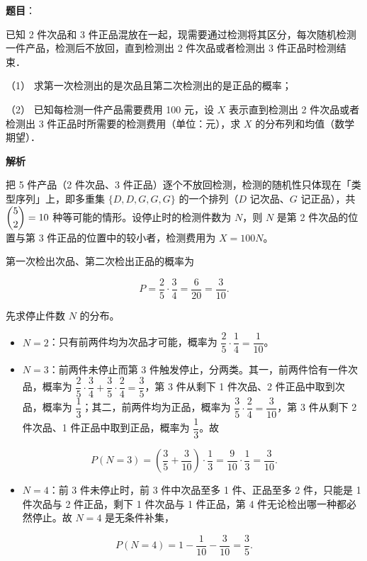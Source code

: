 \begin{answer}

\textbf{题目}：

已知 2 件次品和 3 件正品混放在一起，现需要通过检测将其区分，每次随机检测一件产品，检测后不放回，直到检测出 2 件次品或者检测出 3 件正品时检测结束．

（1） 求第一次检测出的是次品且第二次检测出的是正品的概率；

（2） 已知每检测一件产品需要费用 100 元，设 \(X\) 表示直到检测出 2 件次品或者检测出 3 件正品时所需要的检测费用（单位：元），求 \(X\) 的分布列和均值（数学期望）．

\textbf{解析}

把 5 件产品（2 件次品、3 件正品）逐个不放回检测，检测的随机性只体现在「类型序列」上，即多重集 \(\{D,D,G,G,G\}\) 的一个排列（\(D\) 记次品、\(G\) 记正品），共 \(\dbinom{5}{2}=10\) 种等可能的情形。设停止时的检测件数为 \(N\)，则 \(N\) 是第 2 件次品的位置与第 3 件正品的位置中的较小者，检测费用为 \(X=100N\)。


第一次检出次品、第二次检出正品的概率为

\nopagebreak[4]
\[
P=\dfrac{2}{5}\cdot\dfrac{3}{4}=\dfrac{6}{20}=\dfrac{3}{10}.
\]


先求停止件数 \(N\) 的分布。

\begin{itemize}
\item \(N=2\)：只有前两件均为次品才可能，概率为 \(\dfrac{2}{5}\cdot\dfrac{1}{4}=\dfrac{1}{10}\)。
\item \(N=3\)：前两件未停止而第 3 件触发停止，分两类。其一，前两件恰有一件次品，概率为 \(\dfrac{2}{5}\cdot\dfrac{3}{4}+\dfrac{3}{5}\cdot\dfrac{2}{4}=\dfrac{3}{5}\)，第 3 件从剩下 1 件次品、2 件正品中取到次品，概率为 \(\dfrac{1}{3}\)；其二，前两件均为正品，概率为 \(\dfrac{3}{5}\cdot\dfrac{2}{4}=\dfrac{3}{10}\)，第 3 件从剩下 2 件次品、1 件正品中取到正品，概率为 \(\dfrac{1}{3}\)。故
\end{itemize}
\nopagebreak[4]
\[
  P(N=3)=\left(\dfrac{3}{5}+\dfrac{3}{10}\right)\cdot\dfrac{1}{3}=\dfrac{9}{10}\cdot\dfrac{1}{3}=\dfrac{3}{10}.
\]
\begin{itemize}
\item \(N=4\)：前 3 件未停止时，前 3 件中次品至多 1 件、正品至多 2 件，只能是 1 件次品与 2 件正品，剩下 1 件次品与 1 件正品，第 4 件无论检出哪一种都必然停止。故 \(N=4\) 是无条件补集，
\end{itemize}
\nopagebreak[4]
\[
  P(N=4)=1-\dfrac{1}{10}-\dfrac{3}{10}=\dfrac{3}{5}.
\]


\end{answer}

